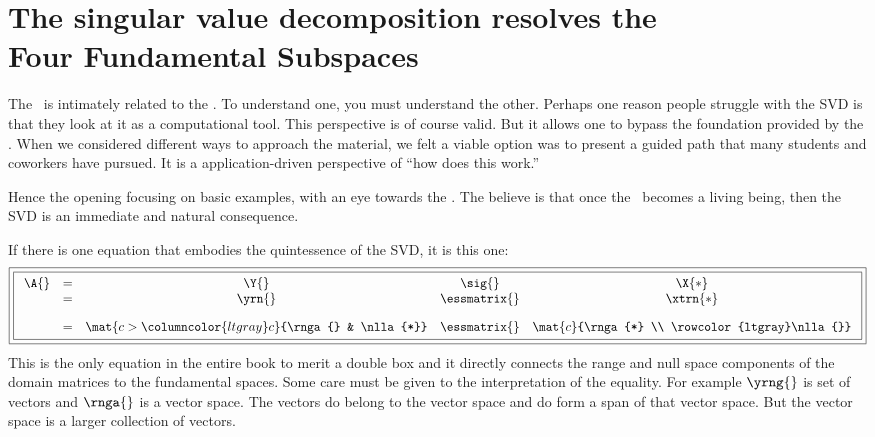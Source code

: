 \section[The SVD and the FTOLA]{The singular value decomposition resolves the \\Four Fundamental Subspaces}
The \svdl \ is intimately related to the \ftola. To understand one, you must understand the other. Perhaps one reason people struggle with the SVD is that they look at it as a computational tool. This perspective is of course valid. But it allows one to bypass the foundation provided by the \ft. When we considered different ways to approach the material, we felt a viable option was to present a guided path that many students and coworkers have pursued. It is a application-driven perspective of ``how does this work.''

Hence the opening focusing on basic examples, with an eye towards the \ft. The believe is that once the \ft \ becomes a living being, then the SVD is an immediate and natural consequence.

If there is one equation that embodies the quintessence of the SVD, it is this one:
\begin{equation}
\boxed{
\boxed{
  \begin{array}{ccccc}
  \A{} & = & \Y{} & \sig{} & \X{*} \\
    & = & \yrn{}
        & \essmatrix{} 
        & \xtrn{*}  \\[10pt]
    & = & \mat{c>{\columncolor{ltgray}}c}{\rnga{} & \nlla{*}} 
        & \essmatrix{} 
        & \mat{c}{\rnga{*} \\ \rowcolor{ltgray}\nlla{}}
  \end{array}  
  }}
  \label{eq:11:tattoo}
\end{equation}
This is the only equation in the entire book to merit a double box and it directly connects the range and null space components of the domain matrices to the fundamental spaces. Some care must be given to the interpretation of the equality. For example $\yrng{}$ is set of vectors and $\rnga{}$ is a vector space. The vectors do belong to the vector space and do form a span of that vector space. But the vector space is a larger collection of vectors.

